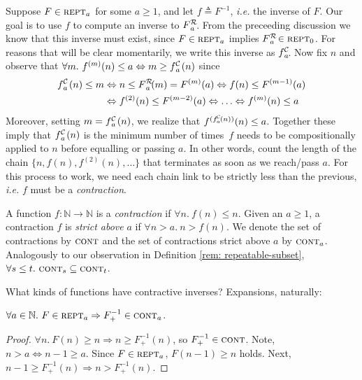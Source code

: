 Suppose $F \in \text{\scshape{rept}}_a$ for some $a \ge 1$, and 
let $f \triangleq F^{-1}$, \emph{i.e.} the inverse of $F$.
Our goal is to use $f$ to compute an inverse to $\rf{F}{a}$.  
From the preceeding discussion we know that this inverse must exist, 
since $F \in \text{\scshape{rept}}_a$ implies $\rf{F}{a} \in \repeatable_0$.  
For reasons that will be clear momentarily, we write this inverse as $\cdt{f}{a}$.  Now
fix $n$ and observe that $\forall m.~f^{(m)}(n)\le a \iff m \ge \cdt{f}{a}(n)$ since
\begin{equation} \label{eq: rf-upp-inv}
\begin{aligned}
\cdt{f}{a}(n)\le m & \iff n\le \rf{F}{a}(m) = F^{(m)}(a) \iff f(n)\le F^{(m-1)}(a) \\
& \iff f^{(2)}(n)\le F^{(m-2)}(a) \iff \ldots \iff f^{(m)}(n)\le a
\end{aligned}
\end{equation}
Moreover, setting $m = \cdt{f}{a}(n)$, we realize that 
$f^{(\cdt{f}{a}(n))}(n) \le a$.  
Together these imply that $\cdt{f}{a}(n)$ is the minimum number of 
times~$f$ needs to be compositionally applied to $n$ before equalling or 
passing $a$.
In other words, count the length of the chain $\{n, f(n), f^{(2)}(n), \ldots\}$ that 
terminates as soon as we reach/pass $a$.  For this process to work, 
we need each chain link
to be strictly less than the previous, \emph{i.e.} $f$ must be a \emph{contraction}.
\begin{defn} \label{defn: contracting}
	A function $f : \mathbb{N} \to \mathbb{N}$ is a \emph{contraction} if $\forall n.~ f(n) \le n$. Given an $a \ge 1$, a contraction $f$ is 
	\emph{strict above} $a$ if $\forall n > a.~n > f(n)$. We denote the set of contractions by $\text{\scshape{cont}}$ and the set of contractions strict above $a$ by $\text{\scshape{cont}}_a$. Analogously to our observation in 
	Definition \ref{rem: repeatable-subset}, $\forall s\le t.~ \text{\scshape{cont}}_s \subseteq \text{\scshape{cont}}_t$.
\end{defn}
What kinds of functions have contractive inverses? Expansions, naturally:
\begin{thm} \label{thm: expansion-inv-contraction}
$\forall a\in \mathbb{N}.~F\in \text{\scshape{rept}}_a \Rightarrow F^{-1}_+ \in \text{\scshape{cont}}_a$.
\end{thm}
\begin{proof}
$\forall n.~F(n)\ge n \Rightarrow n \ge F^{-1}_+(n)$, so $F^{-1}_+ \in
\text{\scshape{cont}}$. Note, $n > a \iff n-1\ge a$.
Since $F\in \text{\scshape{rept}}_a$, $F(n-1)\ge n$ holds. 
Next, $n-1\ge F^{-1}_+(n) \Rightarrow n > F^{-1}_+(n)$. 
\end{proof}

